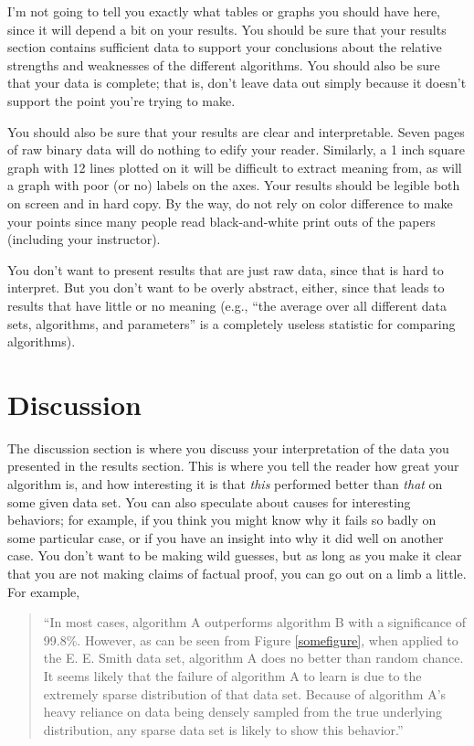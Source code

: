 \documentclass[12pt,letterpaper]{article}
\begin{document}
I'm not going to tell you exactly what tables or graphs you should have here,
since it will depend a bit on your results.  You should be sure that your
results section contains sufficient data to support your conclusions about the
relative strengths and weaknesses of the different algorithms.  You should also
be sure that your data is complete; that is, don't leave data out simply because
it doesn't support the point you're trying to make.

You should also be sure that your results are clear and interpretable.  Seven
pages of raw binary data will do nothing to edify your reader.  Similarly, a
1 inch square graph with 12 lines plotted on it will be difficult to extract
meaning from, as will a graph with poor (or no) labels on the axes.  Your
results should be legible both on screen and in hard copy. By the way, do
not rely on color difference to make your points since many people read
black-and-white print outs of the papers (including your instructor).

You don't want to present results that are just raw data, since that is hard to
interpret.  But you don't want to be overly abstract, either, since that leads to
results that have little or no meaning (e.g., ``the average over all different
data sets, algorithms, and parameters'' is a completely useless statistic for
comparing algorithms).

\section{Discussion}
The discussion section is where you discuss your interpretation of the data you
presented in the results section.  This is where you tell the reader how great
your algorithm is, and how interesting it is that \emph{this} performed better
than \emph{that} on some given data set.  You can also speculate about causes
for interesting behaviors; for example, if you think you might know why it fails
so badly on some particular case, or if you have an insight into why it did well
on another case.  You don't want to be making wild guesses, but as long as you
make it clear that you are not making claims of factual proof, you can go out on
a limb a little.  For example,

\begin{quote}
``In most cases, algorithm A outperforms algorithm B with a significance of
99.8\%.  However, as can be seen from Figure \ref{somefigure}, when applied to
the E. E. Smith data set, algorithm A does no better than random chance.  It
seems likely that the failure of algorithm A to learn is due to the extremely
sparse distribution of that data set.  Because of algorithm A's heavy reliance
on data being densely sampled from the true underlying distribution, any sparse
data set is likely to show this behavior.''
\end{quote}
\end{document}
